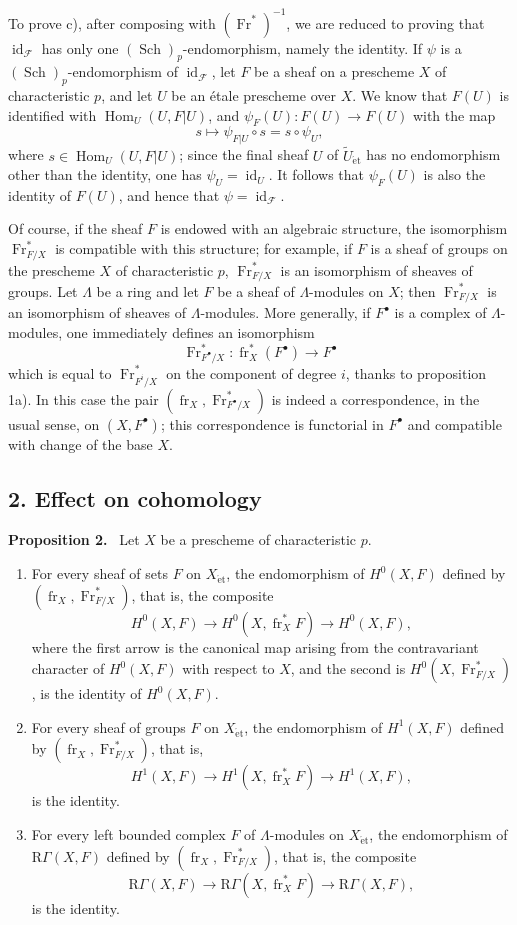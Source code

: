 \documentclass[11pt]{article}
\newenvironment{statement}[1]{\par\medskip\noindent\textbf{#1.}\ }{\par\medskip}
\DeclareMathOperator{\Hom}{Hom}
\providecommand{\et}{\mathrm{\acute{e}t}}
\providecommand{\RGamma}{\mathrm R\Gamma}
\providecommand{\id}{\operatorname{id}}
\providecommand{\Hom}{\operatorname{Hom}}
\providecommand{\id}{\operatorname{id}}
\providecommand{\id}{\operatorname{id}}
\providecommand{\RGamma}{\mathrm R\Gamma}
\providecommand{\id}{\operatorname{id}}
\providecommand{\id}{\operatorname{id}}
\providecommand{\Hom}{\operatorname{Hom}}
\providecommand{\fr}{\operatorname{fr}}
\providecommand{\Fr}{\operatorname{Fr}}
\providecommand{\Sch}{\operatorname{Sch}}
\providecommand{\Fr}{\operatorname{Fr}}
\providecommand{\fr}{\operatorname{fr}}
\providecommand{\Sch}{\operatorname{Sch}}
\providecommand{\id}{\operatorname{id}}
\providecommand{\RGamma}{\mathrm R\Gamma}
\providecommand{\et}{\acute{e}t}
\begin{document}
To prove c), after composing with $(\Fr^*)^{-1}$, we are reduced to proving that $\id_{\mathcal F}$ has only one $(\Sch)_p$-endomorphism, namely the identity. If $\psi$ is a $(\Sch)_p$-endomorphism of $\id_{\mathcal F}$, let $F$ be a sheaf on a prescheme $X$ of characteristic $p$, and let $U$ be an étale prescheme over $X$. We know that $F(U)$ is identified with $\Hom_U(U,F|U)$, and $\psi_F(U):F(U)\to F(U)$ with the map
\[
s\longmapsto \psi_{F|U}\circ s=s\circ\psi_U,
\]
where $s\in\Hom_U(U,F|U)$; since the final sheaf $U$ of $\widetilde U_{\et}$ has no endomorphism other than the identity, one has $\psi_U=\id_U$. It follows that $\psi_F(U)$ is also the identity of $F(U)$, and hence that $\psi=\id_{\mathcal F}$.

Of course, if the sheaf $F$ is endowed with an algebraic structure, the isomorphism $\Fr^*_{F/X}$ is compatible with this structure; for example, if $F$ is a sheaf of groups on the prescheme $X$ of characteristic $p$, $\Fr^*_{F/X}$ is an isomorphism of sheaves of groups. Let $\Lambda$ be a ring and let $F$ be a sheaf of $\Lambda$-modules on $X$; then $\Fr^*_{F/X}$ is an isomorphism of sheaves of $\Lambda$-modules. More generally, if $F^\bullet$ is a complex of $\Lambda$-modules, one immediately defines an isomorphism
\[
\Fr^*_{F^\bullet/X}:\fr_X^*(F^\bullet)\longrightarrow F^\bullet
\]
which is equal to $\Fr^*_{F^i/X}$ on the component of degree $i$, thanks to proposition 1a). In this case the pair $(\fr_X,\Fr^*_{F^\bullet/X})$ is indeed a correspondence, in the usual sense, on $(X,F^\bullet)$; this correspondence is functorial in $F^\bullet$ and compatible with change of the base $X$.

\subsection*{2. Effect on cohomology}

\begin{statement}{Proposition 2}
Let $X$ be a prescheme of characteristic $p$.
\begin{enumerate}[label=\alph*)]
\item For every sheaf of sets $F$ on $X_{\et}$, the endomorphism of $H^0(X,F)$ defined by $(\fr_X,\Fr^*_{F/X})$, that is, the composite
\[
H^0(X,F)\longrightarrow H^0(X,\fr_X^*F)\longrightarrow H^0(X,F),
\]
where the first arrow is the canonical map arising from the contravariant character of $H^0(X,F)$ with respect to $X$, and the second is $H^0(X,\Fr^*_{F/X})$, is the identity of $H^0(X,F)$.
\item For every sheaf of groups $F$ on $X_{\et}$, the endomorphism of $H^1(X,F)$ defined by $(\fr_X,\Fr^*_{F/X})$, that is,
\[
H^1(X,F)\longrightarrow H^1(X,\fr_X^*F)\longrightarrow H^1(X,F),
\]
is the identity.
\item For every left bounded complex $F$ of $\Lambda$-modules on $X_{\et}$, the endomorphism of $\RGamma(X,F)$ defined by $(\fr_X,\Fr^*_{F/X})$, that is, the composite
\[
\RGamma(X,F)\longrightarrow \RGamma(X,\fr_X^*F)\longrightarrow \RGamma(X,F),
\]
is the identity.
\end{enumerate}
\end{statement}
\end{document}
